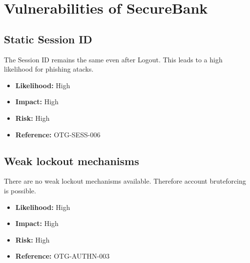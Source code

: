 \section{Vulnerabilities of SecureBank}

\subsection{Static Session ID}
The Session ID remains the same even after Logout.
This leads to a high likelihood for phishing atacks.
\begin{itemize}
	\item \textbf{Likelihood:} High
	\item \textbf{Impact:} High
	\item \textbf{Risk:} High
	\item \textbf{Reference:} OTG-SESS-006
\end{itemize}

\subsection{Weak lockout mechanisms}
There are no weak lockout mechanisms available. Therefore account bruteforcing is possible.
\begin{itemize}
	\item \textbf{Likelihood:} High
	\item \textbf{Impact:} High
	\item \textbf{Risk:} High
	\item \textbf{Reference:} OTG-AUTHN-003
\end{itemize}